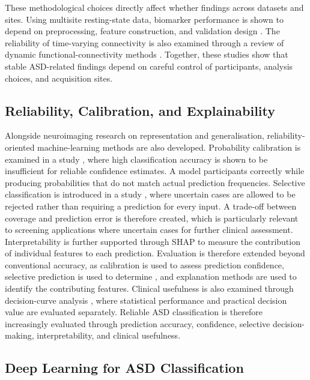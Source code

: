 These methodological choices directly affect whether findings  across datasets and sites. Using multisite resting-state data, biomarker performance is shown to depend on preprocessing, feature construction, and validation design \citep{Abrahametal2017}. The reliability of time-varying connectivity is also examined through a review of dynamic functional-connectivity methods \citep{Pretietal2017}. Together, these studies show that stable ASD-related findings depend on careful control of participants, analysis choices, and acquisition sites.

\subsection{Reliability, Calibration, and Explainability}

Alongside neuroimaging research on representation and generalisation, reliability-oriented machine-learning methods are also developed. Probability calibration is examined in a study \citep{Guoetal2017}, where high classification accuracy is shown to be insufficient for reliable confidence estimates. A model  participants correctly while producing probabilities that do not match actual prediction frequencies. Selective classification is introduced in a study \citep{GeifmanElYaniv2017}, where uncertain cases are allowed to be rejected rather than requiring a prediction for every input. A trade-off between coverage and prediction error is therefore created, which is particularly relevant to screening applications where uncertain cases  for further clinical assessment. Interpretability is further supported through SHAP \citep{LundbergLee2017} to measure the contribution of individual features to each prediction. Evaluation is therefore extended beyond conventional accuracy, as calibration is used to assess prediction confidence, selective prediction is used to determine , and explanation methods are used to identify the contributing features. Clinical usefulness is also examined through decision-curve analysis \citep{VanCalsteretal2018}, where statistical performance and practical decision value are evaluated separately. Reliable ASD classification is therefore increasingly evaluated through prediction accuracy, confidence, selective decision-making, interpretability, and clinical usefulness.


\subsection{Deep Learning for ASD Classification}

